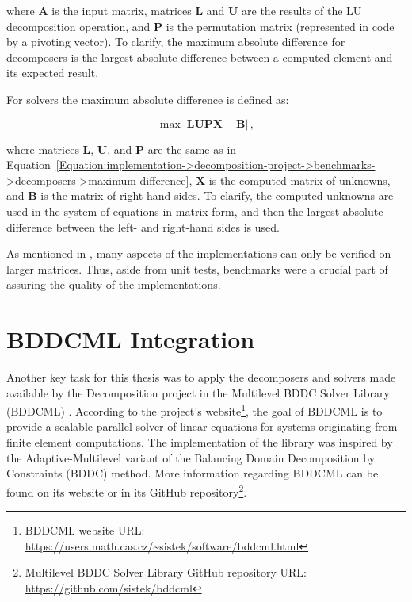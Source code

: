 where $\mathbf{A}$ is the input matrix, matrices $\mathbf{L}$ and $\mathbf{U}$ are the results of the LU decomposition operation, and $\mathbf{P}$ is the permutation matrix (represented in code by a pivoting vector).
To clarify, the maximum absolute difference for decomposers is the largest absolute difference between a computed element and its expected result.

For solvers the maximum absolute difference is defined as:

\begin{equation}
	\max \left| \mathbf{LUPX} - \mathbf{B} \right| \,,
	\label{Equation:implementation->decomposition-project->benchmarks->solvers->maximum-difference}
\end{equation}

where matrices $\mathbf{L}$, $\mathbf{U}$, and $\mathbf{P}$ are the same as in Equation~\ref{Equation:implementation->decomposition-project->benchmarks->decomposers->maximum-difference}, $\mathbf{X}$ is the computed matrix of unknowns, and $\mathbf{B}$ is the matrix of right-hand sides.
To clarify, the computed unknowns are used in the system of equations in matrix form, and then the largest absolute difference between the left- and right-hand sides is used.

As mentioned in  \cite{Cejka2022}, many aspects of the implementations can only be verified on larger matrices.
Thus, aside from unit tests, benchmarks were a crucial part of assuring the quality of the implementations.




\section{BDDCML Integration}\label{Section:implementation->BDDCML}
Another key task for this thesis was to apply the decomposers and solvers made available by the Decomposition project in the Multilevel BDDC Solver Library (BDDCML) \cite{Sistek2011, Sistek2012, Sousedik2013, Sistek2015}.
According to the project's website\footnote{\label{Footnote:implementation->BDDCML-integration->BDDCML-website}BDDCML website URL: \url{https://users.math.cas.cz/~sistek/software/bddcml.html}}, the goal of BDDCML is to provide a scalable parallel solver of linear equations for systems originating from finite element computations.
The implementation of the library was inspired by the Adaptive-Multilevel variant of the Balancing Domain Decomposition by Constraints (BDDC) method.
More information regarding BDDCML can be found on its website or in its GitHub repository\footnote{Multilevel BDDC Solver Library GitHub repository URL: \url{https://github.com/sistek/bddcml}}.

